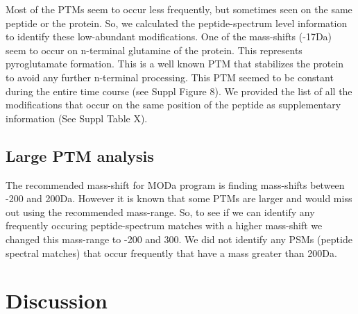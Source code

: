 \documentclass[12pt]{article}
\begin{document}
Most of the PTMs seem to occur less frequently, but sometimes seen on the same peptide or the protein. So, we calculated the peptide-spectrum level information to identify these low-abundant modifications. One of the mass-shifts (-17Da) seem to occur on n-terminal glutamine of the protein. This represents pyroglutamate formation. This is a well known PTM that stabilizes the protein to avoid any further n-terminal processing. This PTM seemed to be constant during the entire time course (see Suppl Figure 8). We provided the list of all the modifications that occur on the same position of the peptide as supplementary information (See Suppl Table X).

\subsection{Large PTM analysis}



The recommended mass-shift for MODa program is finding mass-shifts between -200 and 200Da. However it is known that some PTMs are larger and would miss out using the recommended mass-range. So, to see if we can identify any frequently occuring peptide-spectrum matches with a higher mass-shift we changed this mass-range to -200 and 300. We did not identify any PSMs (peptide spectral matches) that occur frequently that have a mass greater than 200Da. 



\section{Discussion}
\end{document}
